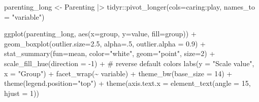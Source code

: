 \documentclass[
  letterpaper,
  10pt,
  krantz2]{krantz}
\makeatletter
\newenvironment{Shaded}{\begin{snugshade}}{\end{snugshade}}
\newcommand{\AttributeTok}[1]{\textcolor[rgb]{0.40,0.45,0.13}{#1}}
\newcommand{\CommentTok}[1]{\textcolor[rgb]{0.37,0.37,0.37}{#1}}
\newcommand{\DecValTok}[1]{\textcolor[rgb]{0.68,0.00,0.00}{#1}}
\newcommand{\FloatTok}[1]{\textcolor[rgb]{0.68,0.00,0.00}{#1}}
\newcommand{\FunctionTok}[1]{\textcolor[rgb]{0.28,0.35,0.67}{#1}}
\newcommand{\NormalTok}[1]{\textcolor[rgb]{0.00,0.23,0.31}{#1}}
\newcommand{\OtherTok}[1]{\textcolor[rgb]{0.00,0.23,0.31}{#1}}
\newcommand{\SpecialCharTok}[1]{\textcolor[rgb]{0.37,0.37,0.37}{#1}}
\newcommand{\StringTok}[1]{\textcolor[rgb]{0.13,0.47,0.30}{#1}}
\newenvironment{kframe}{%
  \medskip{}
  \setlength{\fboxsep}{.8em}
  \def\at@end@of@kframe{}%
  \ifinner\ifhmode%
  \def\at@end@of@kframe{\end{minipage}}%
  \begin{minipage}{\columnwidth}%
  \fi\fi%
  \def\FrameCommand##1{\hskip\@totalleftmargin \hskip-\fboxsep
  \colorbox{shadecolor}{##1}\hskip-\fboxsep
      \hskip-\linewidth \hskip-\@totalleftmargin \hskip\columnwidth}%
  \MakeFramed {\advance\hsize-\width
    \@totalleftmargin\z@ \linewidth\hsize
    \@setminipage}}%
{\par\unskip\endMakeFramed%
  \at@end@of@kframe}
\renewenvironment{Shaded}{\begin{kframe}}{\end{kframe}}
\makeatother
\begin{document}
\begin{Shaded}
\begin{Highlighting}[]
\NormalTok{parenting\_long }\OtherTok{\textless{}{-}}\NormalTok{ Parenting }\SpecialCharTok{|\textgreater{}}
\NormalTok{  tidyr}\SpecialCharTok{::}\FunctionTok{pivot\_longer}\NormalTok{(}\AttributeTok{cols=}\NormalTok{caring}\SpecialCharTok{:}\NormalTok{play, }\AttributeTok{names\_to =} \StringTok{"variable"}\NormalTok{)}

\FunctionTok{ggplot}\NormalTok{(parenting\_long, }
       \FunctionTok{aes}\NormalTok{(}\AttributeTok{x=}\NormalTok{group, }\AttributeTok{y=}\NormalTok{value, }\AttributeTok{fill=}\NormalTok{group)) }\SpecialCharTok{+}
  \FunctionTok{geom\_boxplot}\NormalTok{(}\AttributeTok{outlier.size=}\FloatTok{2.5}\NormalTok{, }
               \AttributeTok{alpha=}\NormalTok{.}\DecValTok{5}\NormalTok{, }
               \AttributeTok{outlier.alpha =} \FloatTok{0.9}\NormalTok{) }\SpecialCharTok{+} 
  \FunctionTok{stat\_summary}\NormalTok{(}\AttributeTok{fun=}\NormalTok{mean, }
               \AttributeTok{color=}\StringTok{"white"}\NormalTok{, }
               \AttributeTok{geom=}\StringTok{"point"}\NormalTok{, }
               \AttributeTok{size=}\DecValTok{2}\NormalTok{) }\SpecialCharTok{+}
  \FunctionTok{scale\_fill\_hue}\NormalTok{(}\AttributeTok{direction =} \SpecialCharTok{{-}}\DecValTok{1}\NormalTok{) }\SpecialCharTok{+}     \CommentTok{\# reverse default colors}
  \FunctionTok{labs}\NormalTok{(}\AttributeTok{y =} \StringTok{"Scale value"}\NormalTok{, }\AttributeTok{x =} \StringTok{"Group"}\NormalTok{) }\SpecialCharTok{+}
  \FunctionTok{facet\_wrap}\NormalTok{(}\SpecialCharTok{\textasciitilde{}}\NormalTok{ variable) }\SpecialCharTok{+}
  \FunctionTok{theme\_bw}\NormalTok{(}\AttributeTok{base\_size =} \DecValTok{14}\NormalTok{) }\SpecialCharTok{+} 
  \FunctionTok{theme}\NormalTok{(}\AttributeTok{legend.position=}\StringTok{"top"}\NormalTok{) }\SpecialCharTok{+}
  \FunctionTok{theme}\NormalTok{(}\AttributeTok{axis.text.x =} \FunctionTok{element\_text}\NormalTok{(}\AttributeTok{angle =} \DecValTok{15}\NormalTok{,}
                                   \AttributeTok{hjust =} \DecValTok{1}\NormalTok{)) }
\end{Highlighting}
\end{Shaded}
\end{document}

